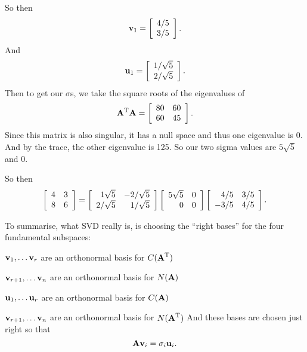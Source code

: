 So then 
\[ \vv_1 = \mat{4/5\\3/5}. \]
And 
\[ \vu_1 = \mat{1/\sqrt{5}\\2/\sqrt{5}}. \]
Then to get our $\sigma$s, we take the square roots of the eigenvalues of
\[ \T\mA\mA = \mat{80&60\\60&45}. \]
Since this matrix is also singular, it has a null space and thus one eigenvalue is 0. And by the trace, the other eigenvalue is 125. So our two sigma values are $5\sqrt5$ and $0$. 

So then
\[ \mat{4&3\\8&6} = \mat{1\sqrt5&-2/\sqrt5\\2/\sqrt5&1/\sqrt5}\mat{5\sqrt5&0\\0&0}\mat{4/5&3/5\\-3/5&4/5}. \]
\eex

To summarise, what SVD really is, is choosing the ``right bases'' for the four fundamental subspaces:
\bit
\item $\vv_1, \ldots \vv_r$ are an orthonormal basis for $C(\T\mA)$
\item $\vv_{r+1}, \ldots \vv_n$ are an orthonormal basis for $N(\mA)$
\item $\vu_1, \ldots \vu_r$ are an orthonormal basis for $C(\mA)$
\item $\vv_{r+1}, \ldots \vv_n$ are an orthonormal basis for $N(\T\mA)$
\eit
And these bases are chosen just right so that
\[ \mA\vv_i = \sigma_i\vu_i. \]